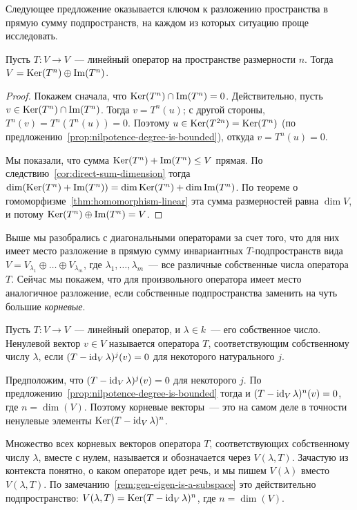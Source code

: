 Следующее предложение оказывается ключом к разложению пространства
в прямую сумму подпространств, на каждом из которых
ситуацию проще исследовать.

\begin{proposition}\label{prop:ker-im-direct-sum}
Пусть $T\colon V\to V$~--- линейный оператор на пространстве
размерности $n$. Тогда
$V = \operatorname{Ker}(T^n)\oplus\operatorname{Im}(T^n)$.
\end{proposition}
\begin{proof}
Покажем сначала, что $\operatorname{Ker}(T^n)\cap\operatorname{Im}(T^n) = 0$.
Действительно, пусть $v\in\operatorname{Ker}(T^n)\cap\operatorname{Im}(T^n)$.
Тогда $v = T^n(u)$; с другой стороны, $T^n(v) = T^n(T^n(u))=0$.
Поэтому $u\in\operatorname{Ker}(T^{2n}) = \operatorname{Ker}(T^n)$ (по
предложению~\ref{prop:nilpotence-degree-is-bounded}), откуда
$v = T^n(u) = 0$.

Мы показали, что сумма $\operatorname{Ker}(T^n) + \operatorname{Im}(T^n)\leq V$ прямая.
По следствию~\ref{cor:direct-sum-dimension}
тогда $\dim(\operatorname{Ker}(T^n)+\operatorname{Im}(T^n)) = \dim\operatorname{Ker}(T^n)
+\dim\operatorname{Im}(T^n)$. По теореме
о гомоморфизме~\ref{thm:homomorphism-linear} эта сумма
размерностей равна $\dim V$,
и потому $\operatorname{Ker}(T^n)\oplus\operatorname{Im}(T^n) = V$.
\end{proof}

Выше мы разобрались с диагональными операторами за счет того,
что для них имеет место разложение в прямую сумму
инвариантных $T$-подпространств вида
$V = V_{\lambda_1}\oplus\dots\oplus V_{\lambda_m}$,
где $\lambda_1,\dots,\lambda_m$~--- все различные собственные числа
оператора $T$. Сейчас мы покажем, что для произвольного оператора
имеет место аналогичное разложение, если собственные
подпространства заменить на чуть большие
{\em корневые}.

\begin{definition}
Пусть $T\colon V\to V$~--- линейный оператор,
и $\lambda\in k$~--- его собственное число.
Ненулевой вектор $v\in V$ называется 
оператора $T$, соответствующим собственному числу $\lambda$,
если $(T-\operatorname{id}_V\lambda)^j(v) = 0$ для некоторого натурального $j$.
\end{definition}
\begin{remark}\label{rem:gen-eigen-is-a-subspace}
Предположим, что $(T-\operatorname{id}_V\lambda)^j(v) = 0$ для некоторого
$j$. По предложению~\ref{prop:nilpotence-degree-is-bounded}
тогда и $(T-\operatorname{id}_V\lambda)^n(v) = 0$, где $n = \dim(V)$.
Поэтому корневые векторы~--- это на самом деле в точности
ненулевые элементы $\operatorname{Ker}(T - \operatorname{id}_V\lambda)^n$.
\end{remark}
\begin{definition}
Множество всех корневых векторов оператора $T$, соответствующих
собственному числу $\lambda$, вместе с нулем, называется
 и обозначается через $V(\lambda,T)$.
Зачастую из контекста понятно, о каком операторе
идет речь, и мы пишем $V(\lambda)$ вместо $V(\lambda,T)$.
По замечанию~\ref{rem:gen-eigen-is-a-subspace} это действительно
подпространство: $V(\lambda,T) = \operatorname{Ker}(T - \operatorname{id}_V\lambda)^n$,
где $n = \dim(V)$.
\end{definition}

